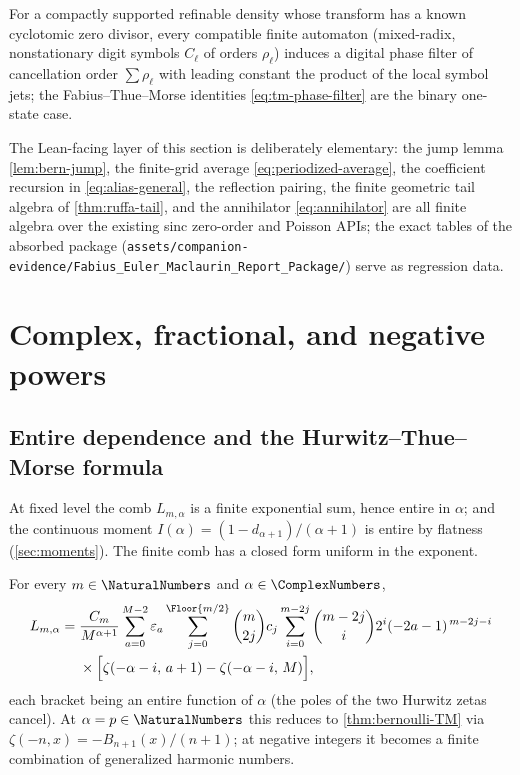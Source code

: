 \begin{conjecture}
\label{conj:automatic-dictionary}
For a compactly supported refinable density whose transform has a
known cyclotomic zero divisor, every compatible finite automaton
(mixed-radix, nonstationary digit symbols $C_\ell$ of orders
$\rho_\ell$) induces a digital phase filter of cancellation order
$\sum\rho_\ell$ with leading constant the product of the local
symbol jets; the Fabius--Thue--Morse identities
\eqref{eq:tm-phase-filter} are the binary one-state case.
\end{conjecture}

The Lean-facing layer of this section is deliberately elementary:
the jump lemma \cref{lem:bern-jump}, the finite-grid average
\eqref{eq:periodized-average}, the coefficient recursion in
\eqref{eq:alias-general}, the reflection pairing, the finite geometric
tail algebra of \cref{thm:ruffa-tail}, and the annihilator
\eqref{eq:annihilator} are all finite algebra over the existing sinc
zero-order and Poisson APIs; the exact tables of the absorbed package
(\nolinkurl{assets/companion-evidence/Fabius_Euler_Maclaurin_Report_Package/}) serve as
regression data.


\section{Complex, fractional, and negative powers}
\label{sec:complex}

\subsection{Entire dependence and the Hurwitz--Thue--Morse formula}

At fixed level the comb $L_{m,\alpha}$ is a finite exponential sum,
hence entire in $\alpha$; and the continuous moment
$I(\alpha)=(1-d_{\alpha+1})/(\alpha+1)$ is entire by flatness
(\cref{sec:moments}).  The finite comb has a closed form uniform in
the exponent.

\begin{theorem}
\label{thm:Hurwitz-comb}
For every $m\in\NaturalNumbers$ and $\alpha\in\ComplexNumbers$,
\begin{equation}
\begin{split}
 L_{m,\alpha}
 ={}&\frac{C_m}{M^{\alpha+1}}
 \sum_{a=0}^{M-2}\eps_a
 \sum_{j=0}^{\Floor{m/2}}\binom m{2j}c_j
 \sum_{i=0}^{m-2j}\binom{m-2j}{i}2^{i}(-2a-1)^{\,m-2j-i}\\
 &\times\Bigl[
 \zeta(-\alpha-i,\,a+1)-\zeta(-\alpha-i,\,M)
 \Bigr],
\end{split}
 \label{eq:Hurwitz-comb}
\end{equation}
each bracket being an entire function of $\alpha$ (the poles of the
two Hurwitz zetas cancel).  At $\alpha=p\in\NaturalNumbers$ this reduces to
\cref{thm:bernoulli-TM} via $\zeta(-n,x)=-B_{n+1}(x)/(n+1)$; at
negative integers it becomes a finite combination of generalized
harmonic numbers.
\end{theorem}

